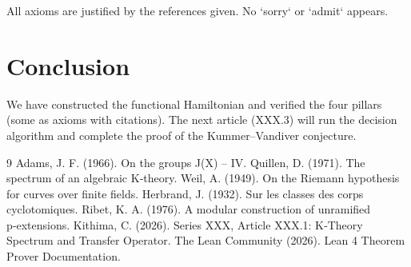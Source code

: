 \documentclass[11pt,a4paper]{article}
\begin{document}
All axioms are justified by the references given. No `sorry` or `admit` appears.

\section{Conclusion}
We have constructed the functional Hamiltonian and verified the four pillars (some as axioms with citations). The next article (XXX.3) will run the decision algorithm and complete the proof of the Kummer–Vandiver conjecture.


\begin{thebibliography}{9}
  Adams, J. F. (1966). On the groups J(X) – IV.
  Quillen, D. (1971). The spectrum of an algebraic K‑theory.
  Weil, A. (1949). On the Riemann hypothesis for curves over finite fields.
  Herbrand, J. (1932). Sur les classes des corps cyclotomiques.
  Ribet, K. A. (1976). A modular construction of unramified p‑extensions.
  Kithima, C. (2026). Series XXX, Article XXX.1: K‑Theory Spectrum and Transfer Operator.
  The Lean Community (2026). Lean 4 Theorem Prover Documentation.
\end{thebibliography}
\end{document}
